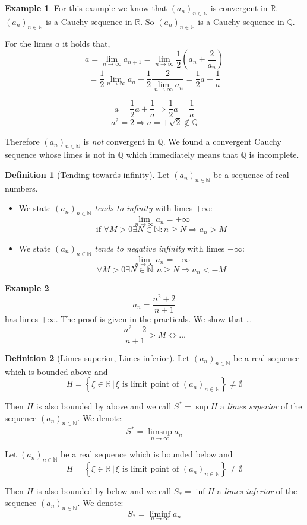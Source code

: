\documentclass[a4paper,landscape,twocolumn]{article}
\theoremstyle{definition}
\newtheorem{defi}{Definition}
\newtheorem{ex}{Example}
\newcommand\setdef[2]{\left\{#1\,|\,#2\right\}}
\newcommand\seq[1]{{\left(#1\right)}_{n \in \mathbb N}}
\begin{document}
\begin{ex}
  For this example we know that $\seq{a_n}$ is convergent in $\mathbb R$.
  $\seq{a_n}$ is a Cauchy sequence in $\mathbb R$.
  So $\seq{a_n}$ is a Cauchy sequence in $\mathbb Q$.

  For the limes $a$ it holds that,
  \[ a = \lim_{n\to\infty} a_{n+1} = \lim_{n\to\infty} \frac12 \left(a_n + \frac{2}{a_n}\right) \]
  \[ = \frac12 \lim_{n\to\infty} a_n + \frac12 \frac{2}{\lim_{n\to\infty} a_n} = \frac12 a + \frac1a \]

  \[ a = \frac12 a + \frac1a \Rightarrow \frac12 a = \frac1a \]
  \[ a^2 = 2 \Rightarrow a = +\sqrt{2} \not\in \mathbb Q \]

  Therefore $\seq{a_n}$ is \emph{not} convergent in $\mathbb Q$.
  We found a convergent Cauchy sequence whose limes is not in $\mathbb Q$ which
  immediately means that $\mathbb Q$ is incomplete.
\end{ex}

\begin{defi}[Tending towards infinity]
  Let $\seq{a_n}$ be a sequence of real numbers.
  \begin{itemize}
    \item
      We state $\seq{a_n}$ \emph{tends to infinity} with limes $+\infty$:
      \[ \lim_{n\to\infty} a_n = +\infty \]
      \[ \text{if } \forall M > 0 \exists N \in \mathbb N: n \geq N \Rightarrow a_n > M \]
    \item
      We state $\seq{a_n}$ \emph{tends to negative infinity} with limes $-\infty$:
      \[ \lim_{n\to\infty} a_n = -\infty \]
      \[ \forall M > 0 \exists N \in \mathbb N: n \geq N \Rightarrow a_n < -M \]
  \end{itemize}
\end{defi}
\begin{ex}
  \[ a_n = \frac{n^2 + 2}{n+1} \]
  has limes $+\infty$.
  The proof is given in the practicals. We show that \dots
  \[ \frac{n^2 + 2}{n + 1} > M \Leftrightarrow \dots \]
\end{ex}

\begin{defi}[Limes superior, Limes inferior]
  Let $\seq{a_n}$ be a real sequence which is bounded above and
  \[ H = \setdef{\xi \in \mathbb R}{\xi \text{ is limit point of } \seq{a_n}} \neq \emptyset \]

  Then $H$ is also bounded by above and we call $S^* = \sup{H}$ a \emph{limes superior}
  of the sequence $\seq{a_n}$. We denote:
  \[ S^* = \limsup_{n\to\infty} a_n \]

  Let $\seq{a_n}$ be a real sequence which is bounded below and
  \[ H = \setdef{\xi \in \mathbb R}{\xi \text{ is limit point of } \seq{a_n}} \neq \emptyset \]

  Then $H$ is also bounded by below and we call $S_* = \inf{H}$ a \emph{limes inferior}
  of the sequence $\seq{a_n}$. We denote:
  \[ S_* = \liminf_{n\to\infty} a_n \]
\end{defi}
\end{document}
